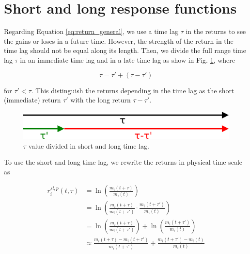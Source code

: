 \section{Short and long response functions}\label{sec:short_long}

Regarding Equation \ref{eq:return_general}, we use a time lag $\tau$ in the
returns to see the gains or loses in a future time. However, the strength of
the return in the time lag should not be equal along its length. Then, we
divide the full range time lag $\tau$ in an immediate time lag and in a late
time lag as show in Fig. \ref{fig:tau_short_long}, where

\begin{equation}\label{eq:tau_short_long}
    \tau = \tau' + \left( \tau - \tau' \right)
\end{equation}

for $\tau' < \tau$. This distinguish the returns depending in the time lag as
the short (immediate) return $\tau'$ with the long return $\tau - \tau'$.

\begin{figure}[htbp]
    \centering
    \includegraphics[width=\columnwidth]{figures/05_tau_short_long.png}
    \caption{$\tau$ value divided in short and long time lag.}
    \label{fig:tau_short_long}
\end{figure}

To use the short and long time lag, we rewrite the returns in physical time
scale as

\begin{align}\label{eq:short_long_return}
    r^{sl,p}_{i}\left(t,\tau\right)&=\ln\left(\frac{m_{i}\left(t+\tau\right)}
    {m_{i} \left(t\right)}\right) \nonumber \\
    &=\ln\left(\frac{m_{i}\left(t+\tau\right)}{m_{i}\left(t+\tau'\right)}
    \cdot\frac{m_{i} \left(t+\tau'\right)}{m_{i}\left(t\right)}\right)
    \nonumber \\
    &=\ln\left(\frac{m_{i}\left(t+\tau\right)}{m_{i}\left(t+\tau'\right)}
    \right)+ \ln\left(\frac{m_{i}\left(t+\tau'\right)}{m_{i}\left(t\right)}
    \right)\nonumber \\
    &\approx\frac{m_{i}\left(t+\tau\right)-m_{i}\left(t+\tau'\right)}
    {m_{i}\left(t+\tau'\right)} +\frac{m_{i}\left(t+\tau'\right)-m_{i}
    \left(t\right)}{m_{i}\left(t\right)}
\end{align}

